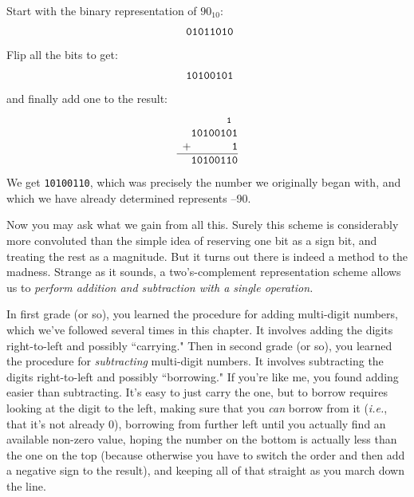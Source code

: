 Start with the binary representation of $90_{10}$:
\[
\begin{array}{*{8}{c@{\hspace{0pt}}}}
 \texttt{0} & \texttt{1} & \texttt{0} & \texttt{1} & \texttt{1} & \texttt{0} & \texttt{1} & \texttt{0} \\
\end{array}
\]
Flip all the bits to get:
\[
\begin{array}{*{8}{c@{\hspace{0pt}}}}
 \texttt{1} & \texttt{0} & \texttt{1} & \texttt{0} & \texttt{0} & \texttt{1} & \texttt{0} & \texttt{1} \\
\end{array}
\]
and finally add one to the result:
\[
\begin{array}{*{9}{c@{\hspace{0pt}}}}
&  & & & & & & \texttt{{\footnotesize 1}} & \\
 & \texttt{1}  & \texttt{0} & \texttt{1} & \texttt{0} & \texttt{0} & \texttt{1} & \texttt{0} & \texttt{1} \\
 + & & \texttt{ } & \texttt{ } & \texttt{ } & \texttt{ } & \texttt{ } & \texttt{ } & \texttt{1} \\
\hline
 & \texttt{1} &  \texttt{0} & \texttt{1} & \texttt{0} & \texttt{0} & \texttt{1} & \texttt{1} & \texttt{0} \\
\end{array}
\]
We get \texttt{10100110}, which was precisely the number we originally
began with, and which we have already determined represents --90.

Now you may ask what we gain from all this. Surely this scheme is
considerably more convoluted than the simple idea of reserving one bit as a
sign bit, and treating the rest as a magnitude. But it turns out there is
indeed a method to the madness. Strange as it sounds, a two's-complement
representation scheme allows us to \textit{perform addition and subtraction
with a single operation.}

In first grade (or so), you learned the procedure for adding multi-digit
numbers, which we've followed several times in this chapter. It involves
adding the digits right-to-left and possibly ``carrying." Then in second
grade (or so), you learned the procedure for \textit{subtracting}
multi-digit numbers. It involves subtracting the digits right-to-left and
possibly ``borrowing." If you're like me, you found adding easier than
subtracting. It's easy to just carry the one, but to borrow requires
looking at the digit to the left, making sure that you \textit{can} borrow
from it (\textit{i.e.}, that it's not already 0), borrowing from further
left until you actually find an available non-zero value, hoping the number
on the bottom is actually less than the one on the top (because otherwise
you have to switch the order and then add a negative sign to the result),
and keeping all of that straight as you march down the line. 

